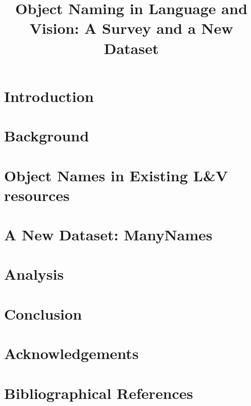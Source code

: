 \documentclass[10pt, a4paper]{article}
\title{Object Naming in Language and Vision: A Survey and a New Dataset}
\begin{document}
\maketitleabstract

\section{Introduction}


\section{Background}
\label{sec:rel-work}


\section{Object Names in Existing L\&V resources}
\label{sec:survey}


\section{A New Dataset: ManyNames}
\label{sec:data}

	
\section{Analysis}
\label{sec:analysis}


\section{Conclusion}
\label{sec:conc}


 \section{Acknowledgements}


\section{Bibliographical References}
\label{main:ref}





\end{document}
